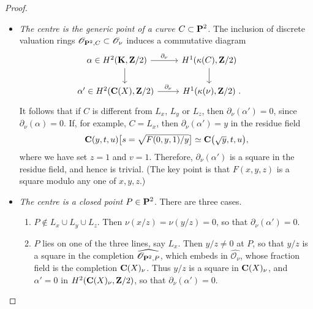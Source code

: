\begin{proof}
    \begin{itemize}
        \item 
            \emph{The centre is the generic point of a curve $C \subset \bbP^2$.}
            The inclusion of discrete valuation rings $\mathscr{O}_{\bbP^2,C} \subset \mathscr{O}_{\nu}$
            induces a commutative diagram
            \[ \begin{tikzcd}
                \llap{$\alpha \in {}$} H^2 (\bbK, \bbZ/2) \ar[d] \ar[r, "\partial_{\nu}"] &
                H^1 (\kappa(C), \bbZ/2) \ar[d] \\
                \llap{$\alpha' \in {}$} H^2 (\bbC (X), \bbZ/2) \ar[r, "\partial_{\nu}"] &
                H^1 (\kappa(\nu), \bbZ/2) \rlap{\ .}
            \end{tikzcd} \]
            It follows that if $C$ is different from $L_x$, $L_y$ or $L_z$,
            then $\partial_{\nu} (\alpha') = 0$, since $\partial_{\nu} (\alpha) = 0$.
            If, for example, $C = L_x$, 
            then $\partial_{\nu} (\alpha') = y$ in the residue field
            \[ \textstyle \bbC (y,t,u) \bigl[ s = \sqrt{F(0,y,1) / y} \bigr] 
                \simeq \bbC \bigl( \sqrt{y}, t, u \bigr), \]
            where we have set $z = 1$ and $v = 1$. Therefore, $\partial_{\nu} (\alpha')$
            is a square in the residue field, and hence is trivial.
            (The key point is that $F(x,y,z)$ is a square modulo any one of $x,y,z$.)
        \item
            \emph{The centre is a closed point $P \in \bbP^2$}.
            There are three cases.

            \begin{enumerate}
                \item
                    $P \notin L_x \cup L_y \cup L_z$.
                    Then $\nu (x/z) = \nu (y/z) = 0$, so that $\partial_{\nu} (\alpha') = 0$.

                \item
                    $P$ lies on one of the three lines, say $L_x$.
                    Then $y/z \neq 0$ at $P$,
                    so that $y/z$ is a square in the completion $\widehat{\mathscr{O}_{\bbP^2,P}}$,
                    which embeds in $\widehat{\mathscr{O}_{\nu}}$, 
                    whose fraction field is the completion $\bbC (X)_{\nu}$.
                    Thus $y/z$ is a square in $\bbC (X)_{\nu}$, 
                    and $\alpha' = 0$ in $H^2 (\bbC (X)_{\nu}, \bbZ/2)$, so that $\partial_{\nu} (\alpha') = 0$.


\end{enumerate}
\end{itemize}
\end{proof}
